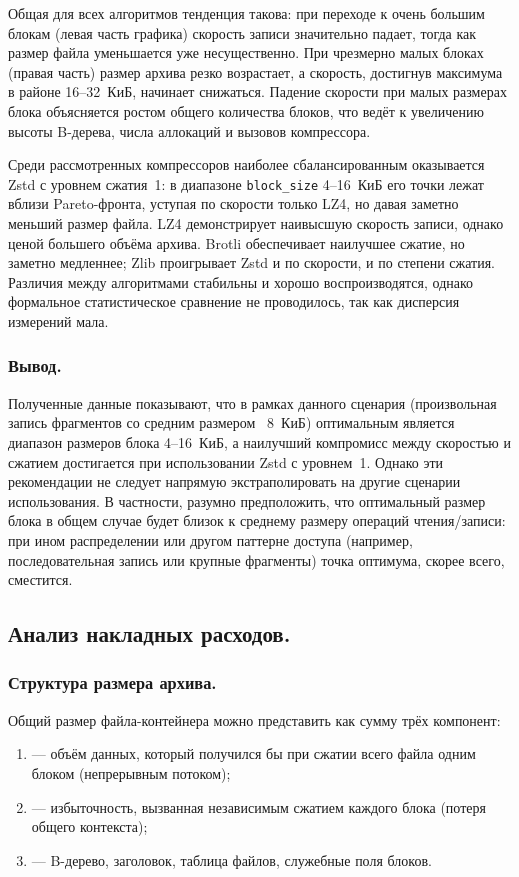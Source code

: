 Общая для всех алгоритмов тенденция такова: при переходе к очень большим блокам (левая часть графика) скорость записи значительно падает, тогда как размер файла уменьшается уже несущественно. При чрезмерно малых блоках (правая часть) размер архива резко возрастает, а скорость, достигнув максимума в районе 16--32~КиБ, начинает снижаться. Падение скорости при малых размерах блока объясняется ростом общего количества блоков, что ведёт к увеличению высоты B-дерева, числа аллокаций и вызовов компрессора.

Среди рассмотренных компрессоров наиболее сбалансированным оказывается Zstd с уровнем сжатия~1: в диапазоне \texttt{block\_size} 4--16~КиБ его точки лежат вблизи Pareto-фронта, уступая по скорости только LZ4, но давая заметно меньший размер файла. LZ4 демонстрирует наивысшую скорость записи, однако ценой большего объёма архива. Brotli обеспечивает наилучшее сжатие, но заметно медленнее; Zlib проигрывает Zstd и по скорости, и по степени сжатия. Различия между алгоритмами стабильны и хорошо воспроизводятся, однако формальное статистическое сравнение не проводилось, так как дисперсия измерений мала.

\subsubsection{Вывод.}
Полученные данные показывают, что в рамках данного сценария (произвольная запись фрагментов со средним размером ~8~КиБ) оптимальным является диапазон размеров блока 4--16~КиБ, а наилучший компромисс между скоростью и сжатием достигается при использовании Zstd с уровнем~1. Однако эти рекомендации не следует напрямую экстраполировать на другие сценарии использования. В частности, разумно предположить, что оптимальный размер блока в общем случае будет близок к среднему размеру операций чтения/записи: при ином распределении или другом паттерне доступа (например, последовательная запись или крупные фрагменты) точка оптимума, скорее всего, сместится.

\subsection{Анализ накладных расходов.}

\subsubsection{Структура размера архива.}
Общий размер файла-контейнера можно представить как сумму трёх компонент:
\begin{enumerate}
    \item \textit{} --- объём данных, который получился бы при сжатии всего файла одним блоком (непрерывным потоком);
    \item \textit{} --- избыточность, вызванная независимым сжатием каждого блока (потеря общего контекста);
    \item \textit{} --- B-дерево, заголовок, таблица файлов, служебные поля блоков.
\end{enumerate}

